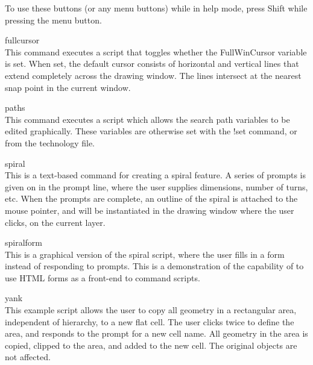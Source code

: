 To use these buttons (or any menu buttons) while in help mode, press
{\kb Shift} while pressing the menu button.

\begin{description}
\item{\cb fullcursor}\\
This command executes a script that toggles whether the {\et
FullWinCursor} variable is set.  When set, the default cursor consists
of horizontal and vertical lines that extend completely across the
drawing window.  The lines intersect at the nearest snap point in the
current window.

\item{\cb paths}\\
This command executes a script which allows the search path variables
to be edited graphically.  These variables are otherwise set with the
{\cb !set} command, or from the technology file.

\item{\cb spiral}\\
This is a text-based command for creating a spiral feature.  A series
of prompts is given on in the prompt line, where the user supplies
dimensions, number of turns, etc.  When the prompts are complete, an
outline of the spiral is attached to the mouse pointer, and will be
instantiated in the drawing window where the user clicks, on the
current layer.

\item{\cb spiralform}\\
This is a graphical version of the {\cb spiral} script, where the user
fills in a form instead of responding to prompts.  This is a
demonstration of the capability of {\Xic} to use HTML forms as a
front-end to command scripts.

\item{\cb yank}\\
This example script allows the user to copy all geometry in a
rectangular area, independent of hierarchy, to a new flat cell.  The
user clicks twice to define the area, and responds to the prompt for a
new cell name.  All geometry in the area is copied, clipped to the
area, and added to the new cell.  The original objects are not
affected.
\end{description}

